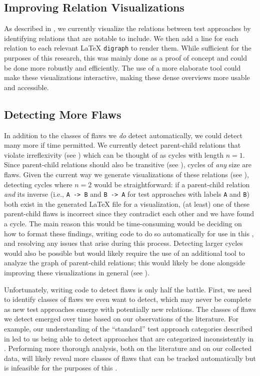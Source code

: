 \subsection{Improving Relation Visualizations}\label{future-rel-vis}
As described in , we currently visualize the relations
between test approaches by identifying relations that are notable to include.
We then add a line for each relation to each relevant \LaTeX{}
\texttt{digraph} to render them. While sufficient for the purposes of this
research, this was mainly done as a proof of concept and
could be done more robustly and efficiently. The use of a more elaborate tool
could make these visualizations interactive, making these dense overviews more
usable and accessible.

\subsection{Detecting More Flaws}\label{future-detect-flaws}
In addition to the classes of flaws we \emph{do} detect automatically, we could
detect many more if time permitted. We currently detect parent-child relations
that violate irreflexivity (see ) which can be thought of as
cycles with length $n=1$. Since parent-child relations should also be
transitive (see ), cycles of \emph{any} size are flaws.
Given the current way we generate visualizations of these relations (see
), detecting cycles where $n=2$ would be straightforward: if
a parent-child relation \emph{and} its inverse (i.e., \texttt{A~->~B} and
\texttt{B~->~A} for test approaches with labels \texttt{A} and \texttt{B}) both
exist in the generated \LaTeX{} file for a visualization, (at least) one of
these parent-child flaws is incorrect since they contradict each other and we
have found a cycle. The main reason this would be time-consuming would be
deciding on how to format these findings, writing code to do so automatically
for use in this \docType{}, and resolving any issues that arise during this
process. Detecting larger cycles would also be possible but would likely
require the use of an additional tool to analyze the graph of parent-child
relations; this would likely be done alongside improving these visualizations
in general (see ).

Unfortunately, writing code to detect flaws is only half the battle. First, we
need to identify classes of flaws we even want to detect, which may never be
complete as new test approaches emerge with potentially new relations. The
classes of flaws we detect emerged over time based on our observations of the
literature. For example, our understanding of the ``standard'' test approach
categories described in  led to us being able to detect
approaches that are categorized inconsistently in .
Performing more thorough analysis, both on the literature and on our collected
data, will likely reveal more classes of flaws that can be tracked
automatically but is infeasible for the purposes of this \docType{}.
